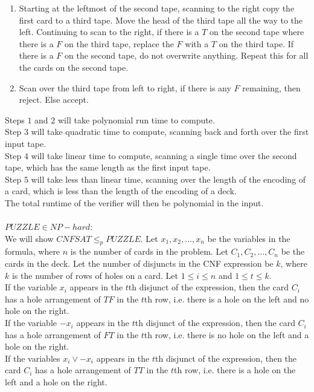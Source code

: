 \documentclass{assignment}
\begin{document}
\begin{problemlist}
\begin{answer}
\begin{enumerate}
\item Starting at the leftmost of the second tape, scanning to the right copy the first card to a third tape. Move the head of the third tape all the way to the left. Continuing to scan to the right, if there is a $T$ on the second tape where there is a $F$ on the third tape, replace the $F$ with a $T$ on the third tape. If there is a $F$ on the second tape, do not overwrite anything. Repeat this for all the cards on the second tape.
\item Scan over the third tape from left to right, if there is any $F$ remaining, then reject. Else accept.
\end{enumerate}
Steps $1$ and $2$ will take polynomial run time to compute.\\
Step $3$ will take quadratic time to compute, scanning back and forth over the first input tape.\\
Step $4$ will take linear time to compute, scanning a single time over the second tape, which has the same length as the first input tape.\\
Step $5$ will take less than linear time, scanning over the length of the encoding of a card, which is less than the length of the encoding of a deck.\\
The total runtime of the verifier will then be polynomial in the input.\\
\\$PUZZLE \in NP-hard$:\\
We will show $CNFSAT \le_p PUZZLE$. Let $x_1,x_2,\ldots,x_n$ be the variables in the formula, where $n$ is the number of cards in the problem. Let $C_1,C_2,\ldots,C_n$ be the cards in the deck. Let the number of disjuncts in the CNF expression be $k$, where $k$ is the number of rows of holes on a card. Let $1\le i \le n$ and $1 \le t \le k$.\\
If the variable $x_i$ appears in the $t$th disjunct of the expression, then the card $C_i$ has a hole arrangement of $TF$ in the $t$th row, i.e. there is a hole on the left and no hole on the right.\\
If the variable $-x_i$ appears in the $t$th disjunct of the expression, then the card $C_i$ has a hole arrangement of $FT$ in the $t$th row, i.e. there is no hole on the left and a hole on the right.\\
If the variables $x_i \vee -x_i$ appears in the $t$th disjunct of the expression, then the card $C_i$ has a hole arrangement of $TT$ in the $t$th row, i.e. there is a hole on the left and a hole on the right.\\

\end{answer}
\end{problemlist}
\end{document}
